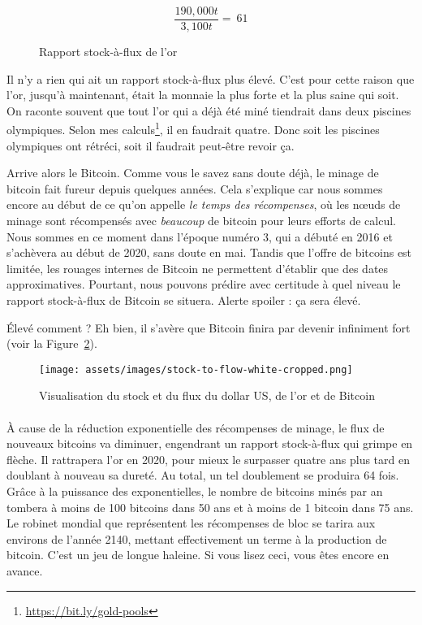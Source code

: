 \begin{figure}
  \centering
  \begin{equation}
  \frac{190,000 t}{3,100 t} = ~ 61
  \end{equation}
  \caption{Rapport stock-à-flux de l'or}
  \label{fig:stock-to-flow-gold}
\end{figure}

Il n'y a rien qui ait un rapport stock-à-flux plus élevé. C'est pour cette
raison que l'or, jusqu'à maintenant, était la monnaie la plus forte et la plus
saine qui soit. On raconte souvent que tout l'or qui a déjà été miné tiendrait
dans deux piscines olympiques. Selon mes
calculs\footnote{\url{https://bit.ly/gold-pools}}, il en faudrait quatre. Donc
soit les piscines olympiques ont rétréci, soit il faudrait peut-être revoir ça.

Arrive alors le Bitcoin. Comme vous le savez sans doute déjà, le minage de
bitcoin fait fureur depuis quelques années. Cela s'explique car nous sommes
encore au début de ce qu'on appelle \textit{le temps des récompenses}, où les
nœuds de minage sont récompensés avec \textit{beaucoup} de bitcoin pour leurs
efforts de calcul. Nous sommes en ce moment dans l'époque numéro 3, qui a débuté
en 2016 et s'achèvera au début de 2020, sans doute en mai. Tandis que l'offre de
bitcoins est limitée, les rouages internes de Bitcoin ne permettent d'établir
que des dates approximatives. Pourtant, nous pouvons prédire avec certitude à
quel niveau le rapport stock-à-flux de Bitcoin se situera. Alerte spoiler : ça
sera élevé.

Élevé comment ? Eh bien, il s'avère que Bitcoin finira par devenir infiniment
fort (voir la Figure~\ref{fig:stock-to-flow-white-cropped}).

\begin{figure}
  \texttt{[image: assets/images/stock-to-flow-white-cropped.png]}
  \caption{Visualisation du stock et du flux du dollar US, de l'or et de
  Bitcoin}
  \label{fig:stock-to-flow-white-cropped}
\end{figure}

\paragraph{}
À cause de la réduction exponentielle des récompenses de minage, le flux de
nouveaux bitcoins va diminuer, engendrant un rapport stock-à-flux qui grimpe en
flèche. Il rattrapera l'or en 2020, pour mieux le surpasser quatre ans plus tard
en doublant à nouveau sa dureté. Au total, un tel doublement se produira 64
fois. Grâce à la puissance des exponentielles, le nombre de bitcoins minés par
an tombera à moins de 100 bitcoins dans 50 ans et à moins de 1 bitcoin dans 75
ans. Le robinet mondial que représentent les récompenses de bloc se tarira aux
environs de l'année 2140, mettant effectivement un terme à la production de
bitcoin. C'est un jeu de longue haleine. Si vous lisez ceci, vous êtes encore en
avance.


